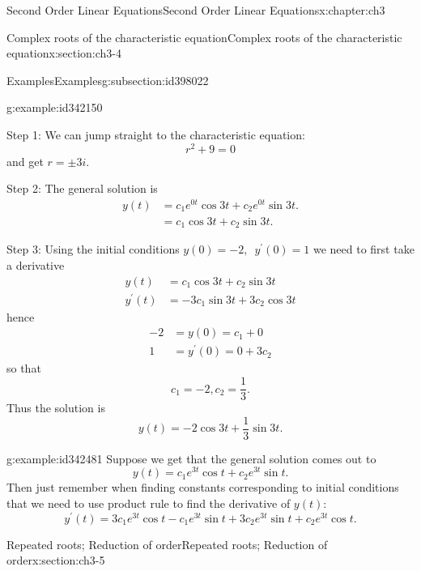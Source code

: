 \documentclass[oneside,10pt,]{book}
\numberwithin{equation}{section}
\numberwithin{equation}{section}
\newcommand{\amp}{&}
\begin{document}
\begin{chapterptx}{Second Order Linear Equations}{}{Second Order Linear Equations}{}{}{x:chapter:ch3}
\begin{sectionptx}{Complex roots of the characteristic equation}{}{Complex roots of the characteristic equation}{}{}{x:section:ch3-4}
\begin{subsectionptx}{Examples}{}{Examples}{}{}{g:subsection:id398022}
\begin{example}{}{g:example:id342150}
\begin{equation*}
\end{equation*}
%
\par
Step 1: We can jump straight to the characteristic equation:%
\begin{equation*}
r^{2}+9=0
\end{equation*}
and get \(r=\pm3i\).%
\par
Step 2: The general solution is%
\begin{align*}
y(t) \amp =c_{1}e^{0t}\cos3t+c_{2}e^{0t}\sin3t.\\
\amp =c_{1}\cos3t+c_{2}\sin3t.
\end{align*}
%
\par
Step 3: Using the initial conditions \(y(0)=-2,\,\,\,y^{\prime}(0)=1\) we need to first take a derivative%
\begin{align*}
y(t) \amp =c_{1}\cos3t+c_{2}\sin3t\\
y^{\prime}(t) \amp =-3c_{1}\sin3t+3c_{2}\cos3t
\end{align*}
hence%
\begin{align*}
-2 \amp =y(0)=c_{1}+0\\
1 \amp =y^{\prime}(0)=0+3c_{2}
\end{align*}
so that%
\begin{equation*}
c_{1}=-2,c_{2}=\frac{1}{3}.
\end{equation*}
Thus the solution is%
\begin{equation*}
y(t)=-2\cos3t+\frac{1}{3}\sin3t.
\end{equation*}
%
\end{example}
\begin{example}{}{g:example:id342481}%
Suppose we get that the general solution comes out to%
\begin{equation*}
y(t)=c_{1}e^{3t}\cos t+c_{2}e^{3t}\sin t.
\end{equation*}
Then just remember when finding constants corresponding to initial conditions that we need to use product rule to find the derivative of \(y(t)\):%
\begin{equation*}
y^{\prime}(t)=3c_{1}e^{3t}\cos t-c_{1}e^{3t}\sin t+3c_{2}e^{3t}\sin t+c_{2}e^{3t}\cos t.
\end{equation*}
%
\end{example}
\end{subsectionptx}
\end{sectionptx}
%
%
\typeout{************************************************}
\typeout{************************************************}
%
\begin{sectionptx}{Repeated roots; Reduction of order}{}{Repeated roots; Reduction of order}{}{}{x:section:ch3-5}

\end{sectionptx}
\end{chapterptx}
\end{document}
